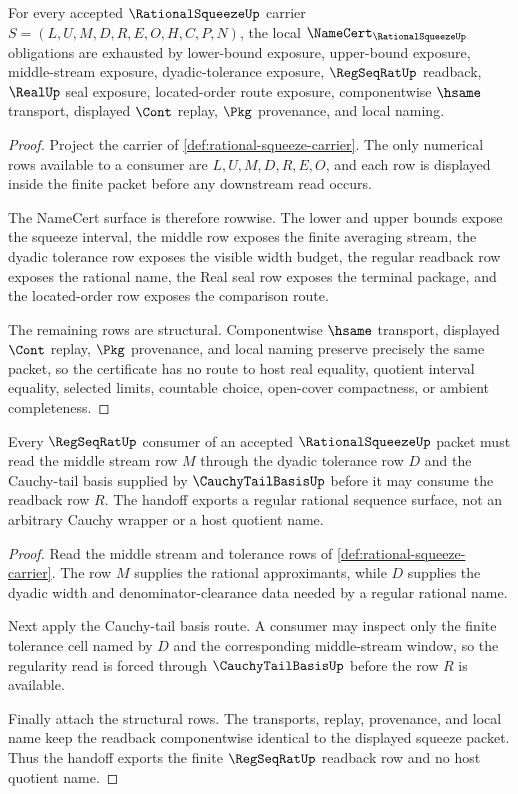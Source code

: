 \begin{theorem}
\label{thm:rational-squeeze-namecert-obligations}
For every accepted $\RationalSqueezeUp$ carrier $S=(L,U,M,D,R,E,O,H,C,P,N)$, the local $\NameCert_{\RationalSqueezeUp}$ obligations are exhausted by lower-bound exposure, upper-bound exposure, middle-stream exposure, dyadic-tolerance exposure, $\RegSeqRatUp$ readback, $\RealUp$ seal exposure, located-order route exposure, componentwise $\hsame$ transport, displayed $\Cont$ replay, $\Pkg$ provenance, and local naming.
\end{theorem}
\begin{proof}
Project the carrier of \autoref{def:rational-squeeze-carrier}. The only numerical rows available to a consumer are $L,U,M,D,R,E,O$, and each row is displayed inside the finite packet before any downstream read occurs.

The NameCert surface is therefore rowwise. The lower and upper bounds expose the squeeze interval, the middle row exposes the finite averaging stream, the dyadic tolerance row exposes the visible width budget, the regular readback row exposes the rational name, the Real seal row exposes the terminal package, and the located-order row exposes the comparison route.

The remaining rows are structural. Componentwise $\hsame$ transport, displayed $\Cont$ replay, $\Pkg$ provenance, and local naming preserve precisely the same packet, so the certificate has no route to host real equality, quotient interval equality, selected limits, countable choice, open-cover compactness, or ambient completeness.
\end{proof}

\begin{theorem}
\label{thm:rational-squeeze-regseqrat-handoff}
Every $\RegSeqRatUp$ consumer of an accepted $\RationalSqueezeUp$ packet must read the middle stream row $M$ through the dyadic tolerance row $D$ and the Cauchy-tail basis supplied by $\CauchyTailBasisUp$ before it may consume the readback row $R$. The handoff exports a regular rational sequence surface, not an arbitrary Cauchy wrapper or a host quotient name.
\end{theorem}
\begin{proof}
Read the middle stream and tolerance rows of \autoref{def:rational-squeeze-carrier}. The row $M$ supplies the rational approximants, while $D$ supplies the dyadic width and denominator-clearance data needed by a regular rational name.

Next apply the Cauchy-tail basis route. A consumer may inspect only the finite tolerance cell named by $D$ and the corresponding middle-stream window, so the regularity read is forced through $\CauchyTailBasisUp$ before the row $R$ is available.

Finally attach the structural rows. The transports, replay, provenance, and local name keep the readback componentwise identical to the displayed squeeze packet. Thus the handoff exports the finite $\RegSeqRatUp$ readback row and no host quotient name.
\end{proof}

